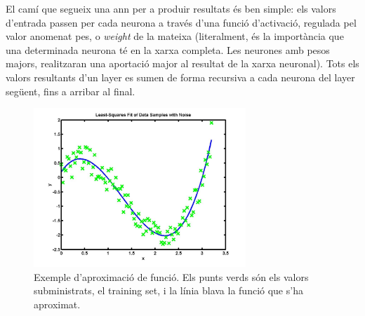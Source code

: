 El camí que segueix una \ac{ann} per a produir resultats és ben simple: els valors d'entrada passen per cada neurona a través d'una funció d'activació, regulada
pel valor anomenat pes, o \emph{weight} de la mateixa (literalment, és la importància que una determinada neurona
té en la xarxa completa. Les neurones amb pesos majors, realitzaran una aportació major al resultat de la xarxa neuronal). Tots els valors resultants d'un
layer es sumen de forma recursiva a cada neurona del layer següent, fins a arribar al final.

\begin{figure}[ht!]
\centering
\includegraphics[width=80mm]{data/func_approx.jpg}
\caption{Exemple d'aproximació de funció. Els punts verds són els valors subministrats, el training set,
i la línia blava la funció que s'ha aproximat.}
\label{func_approx}
\end{figure}